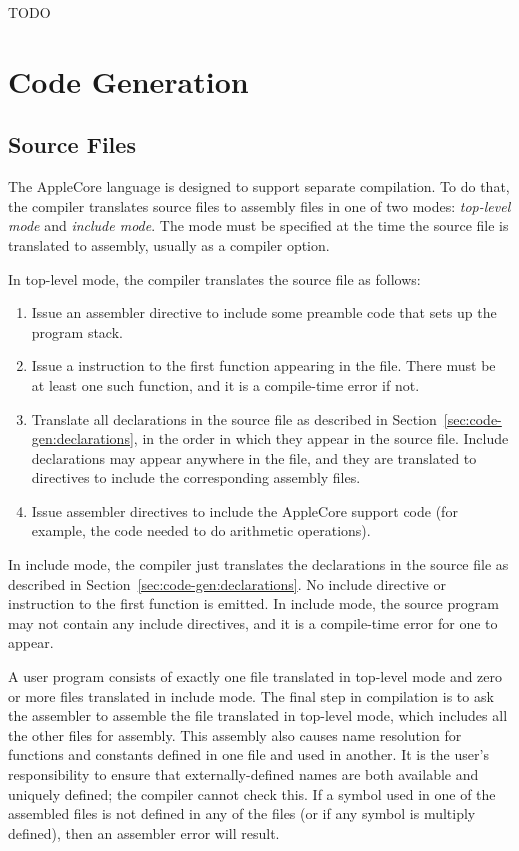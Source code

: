 \documentclass[10pt]{article}
\begin{document}
TODO

\section{Code Generation}
\label{sec:code-gen}

\subsection{Source Files}
\label{sec:code-gen:source-files}

The AppleCore language is designed to support separate compilation.
To do that, the compiler translates source files to assembly files in
one of two modes: \emph{top-level mode} and \emph{include mode}.  The
mode must be specified at the time the source file is translated to
assembly, usually as a compiler option.

  In top-level mode, the compiler translates
the source file as follows:
%
\begin{enumerate}
%
\item Issue an assembler directive to include some preamble code that
  sets up the program stack.
%
\item Issue a  instruction to the first function appearing in
  the file.  There must be at least one such function, and it is a
  compile-time error if not.
%
\item Translate all declarations in the source file as described in
  Section~\ref{sec:code-gen:declarations}, in the order in which they
  appear in the source file.  Include declarations may appear anywhere
  in the file, and they are translated to directives to include the
  corresponding assembly files.
%
\item Issue assembler directives to include the AppleCore support code
  (for example, the code needed to do arithmetic operations).
%
\end{enumerate}

 In include mode, the compiler just translates
the declarations in the source file as described in
Section~\ref{sec:code-gen:declarations}.  No include directive or
 instruction to the first function is emitted.  In include
mode, the source program may not contain any include directives, and
it is a compile-time error for one to appear.

 A user program consists
of exactly one file translated in top-level mode and zero or more
files translated in include mode.  The final step in compilation is to
ask the assembler to assemble the file translated in top-level mode,
which includes all the other files for assembly.  This assembly also
causes name resolution for functions and constants defined in one file
and used in another.  It is the user's responsibility to ensure that
externally-defined names are both available and uniquely defined; the
compiler cannot check this.  If a symbol used in one of the assembled
files is not defined in any of the files (or if any symbol is multiply
defined), then an assembler error will result.
\end{document}
